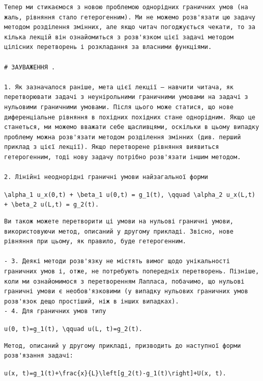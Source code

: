 \documentclass[
  ukrainian,
]{article}
\begin{document}
\begin{verbatim}
Тепер ми стикаємося з новою проблемою однорідних граничних умов (на жаль, рівняння стало гетерогенним). Ми не можемо розв'язати цю задачу методом розділення змінних, але якщо читач погоджується чекати, то за кілька лекцій він ознайомиться з розв'язком цієї задачі методом цілісних перетворень і розкладання за власними функціями.

# ЗАУВАЖЕННЯ .

1. Як зазначалося раніше, мета цієї лекції — навчити читача, як перетворювати задачі з неунірольними граничними умовами на задачі з нульовими граничними умовами. Після цього може статися, що нове диференціальне рівняння в похідних похідних стане однорідним. Якщо це станеться, ми можемо вважати себе щасливцями, оскільки в цьому випадку проблему можна розв'язати методом розділення змінних (див. перший приклад з цієї лекції). Якщо перетворене рівняння виявиться гетерогенним, тоді нову задачу потрібно розв'язати іншим методом.

2. Лінійні неоднорідні граничні умови найзагальної форми
\end{verbatim}

\texttt{\textbackslash{}alpha\_1\ u\_x(0,t)\ +\ \textbackslash{}beta\_1\ u(0,t)\ =\ g\_1(t),\ \textbackslash{}qquad\ \textbackslash{}alpha\_2\ u\_x(L,t)\ +\ \textbackslash{}beta\_2\ u(L,t)\ =\ g\_2(t).}

\begin{verbatim}
Ви також можете перетворити ці умови на нульові граничні умови, використовуючи метод, описаний у другому прикладі. Звісно, нове рівняння при цьому, як правило, буде гетерогенним.

- 3. Деякі методи розв'язку не містять вимог щодо унікальності граничних умов і, отже, не потребують попередніх перетворень. Пізніше, коли ми ознайомимося з перетворенням Лапласа, побачимо, що нульові граничні умови є необов'язковими (у випадку нульових граничних умов розв'язок дещо простіший, ніж в інших випадках).
- 4. Для граничних умов типу
\end{verbatim}

\texttt{u(0,\ t)=g\_1(t),\ \textbackslash{}qquad\ u(L,\ t)=g\_2(t).}

\begin{verbatim}
Метод, описаний у другому прикладі, призводить до наступної форми розв'язання задачі:
\end{verbatim}

\texttt{u(x,\ t)=g\_1(t)+\textbackslash{}frac\{x\}\{L\}\textbackslash{}left{[}g\_2(t)-g\_1(t)\textbackslash{}right{]}+U(x,\ t).}
\end{document}
